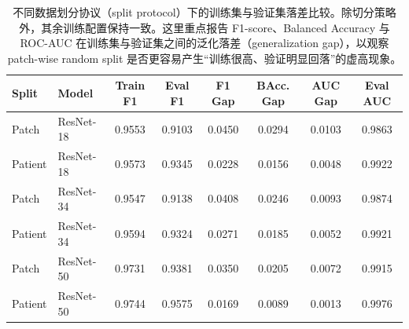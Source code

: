 \begin{table}[t]
    \centering
    \footnotesize
    \setlength{\tabcolsep}{2pt}
    \caption{不同数据划分协议（split protocol）下的训练集与验证集落差比较。除切分策略外，其余训练配置保持一致。这里重点报告 F1-score、Balanced Accuracy 与 ROC-AUC 在训练集与验证集之间的泛化落差（generalization gap），以观察 patch-wise random split 是否更容易产生“训练很高、验证明显回落”的虚高现象。}
    \label{tab:split_protocol_comparison}
    \begin{tabular*}{\textwidth}{@{\extracolsep{\fill}}p{1.45cm}lcccccc@{}}
        \toprule
        Split & Model & Train F1 & Eval F1 & F1 Gap & BAcc. Gap & AUC Gap & Eval AUC \\
        \midrule
        Patch & ResNet-18 & 0.9553 & 0.9103 & 0.0450 & 0.0294 & 0.0103 & 0.9863 \\
        Patient & ResNet-18 & 0.9573 & 0.9345 & 0.0228 & 0.0156 & 0.0048 & 0.9922 \\
        Patch & ResNet-34 & 0.9547 & 0.9138 & 0.0408 & 0.0246 & 0.0093 & 0.9874 \\
        Patient & ResNet-34 & 0.9594 & 0.9324 & 0.0271 & 0.0185 & 0.0052 & 0.9921 \\
        Patch & ResNet-50 & 0.9731 & 0.9381 & 0.0350 & 0.0205 & 0.0072 & 0.9915 \\
        Patient & ResNet-50 & 0.9744 & 0.9575 & 0.0169 & 0.0089 & 0.0013 & 0.9976 \\
        \bottomrule
    \end{tabular*}
\end{table}
